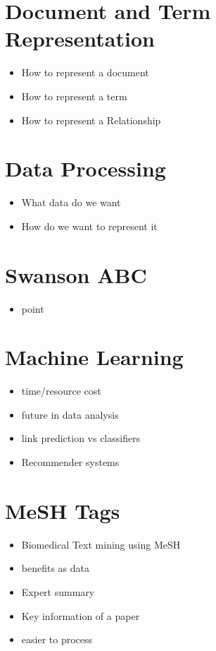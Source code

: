 \documentclass{l4proj}
\begin{document}
\section{Document and Term Representation}
\begin{itemize}
    \item How to represent a document
    \item How to represent a term
    \item How to represent a Relationship
\end{itemize}
\section{Data Processing}
\begin{itemize}
    \item What data do we want
    \item How do we want to represent it
\end{itemize}
\section{Swanson ABC}
\begin{itemize}
    \item point
\end{itemize}
\section{Machine Learning}
\begin{itemize}
    \item time/resource cost
    \item future in data analysis
    \item link prediction vs classifiers
    \item Recommender systems
\end{itemize}
\section{MeSH Tags}
\begin{itemize}
    \item Biomedical Text mining using MeSH
    \item benefits as data 
    \item Expert summary
    \item Key information of a paper
    \item easier to process
\end{itemize}
\end{document}
